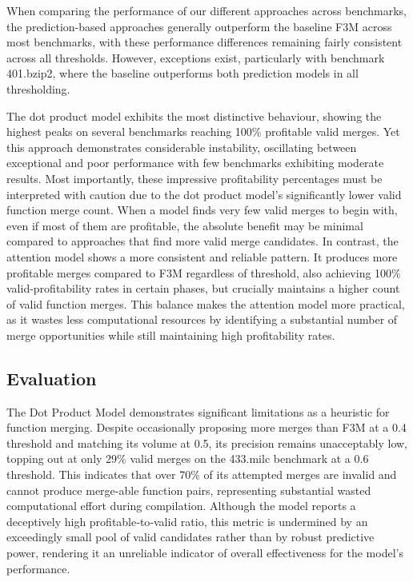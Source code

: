 When comparing the performance of our different approaches across benchmarks, the prediction-based approaches generally outperform the baseline F3M across most benchmarks, with these performance differences remaining fairly consistent across all thresholds. However, exceptions exist, particularly with benchmark 401.bzip2, where the baseline outperforms both prediction models in all thresholding.

The dot product model exhibits the most distinctive behaviour, showing the highest peaks on several benchmarks reaching 100\% profitable valid merges. Yet this approach demonstrates considerable instability, oscillating between exceptional and poor performance with few benchmarks exhibiting moderate results. Most importantly, these impressive profitability percentages must be interpreted with caution due to the dot product model's significantly lower valid function merge count. When a model finds very few valid merges to begin with, even if most of them are profitable, the absolute benefit may be minimal compared to approaches that find more valid merge candidates.
In contrast, the attention model shows a more consistent and reliable pattern. It produces more profitable merges compared to F3M regardless of threshold, also achieving 100\% valid-profitability rates in certain phases, but crucially maintains a higher count of valid function merges. This balance makes the attention model more practical, as it wastes less computational resources by identifying a substantial number of merge opportunities while still maintaining high profitability rates.

\subsection{Evaluation}
The Dot Product Model demonstrates significant limitations as a heuristic for function merging. Despite occasionally proposing more merges than F3M at a 0.4 threshold and matching its volume at 0.5, its precision remains unacceptably low, topping out at only 29\% valid merges on the 433.milc benchmark at a 0.6 threshold. This indicates that over 70\% of its attempted merges are invalid and cannot produce merge-able function pairs, representing substantial wasted computational effort during compilation. Although the model reports a deceptively high profitable‑to‑valid ratio, this metric is undermined by an exceedingly small pool of valid candidates rather than by robust predictive power, rendering it an unreliable indicator of overall effectiveness for the model's performance.


